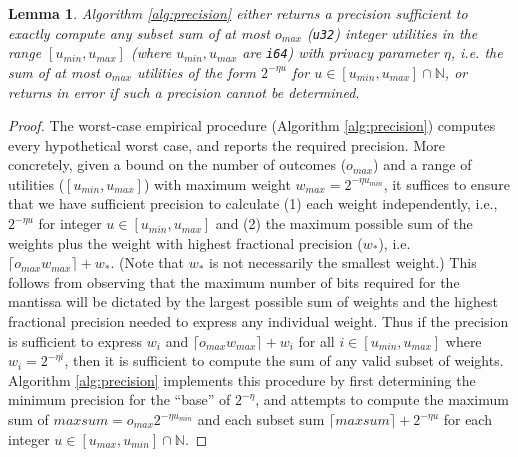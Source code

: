 \documentclass[11pt]{article}
\newtheorem{lemma}[theorem]{Lemma}
\theoremstyle{definition}
\newcommand{\N}{\mathbb{N}}
\newcommand{\unsigned}[1]{{\tt u#1}}
\newcommand{\signed}[1]{{\tt i#1}}
\begin{document}
\begin{lemma}\label{lemma:minexpprec}
Algorithm \ref{alg:precision} either returns a precision sufficient to exactly compute any subset sum of at most $o_{max}$ (\unsigned{32}) integer utilities in the range $[u_{min},u_{max}]$ (where $u_{min},u_{max}$ are \signed{64}) with privacy parameter $\eta$, i.e. the sum of at most $o_{max}$ utilities of the form $2^{-\eta u}$ for $u \in [u_{min},u_{max}] \cap \N$, or returns in error if such a precision cannot be determined.
\end{lemma}
\begin{proof}
The worst-case empirical procedure (Algorithm \ref{alg:precision}) computes every hypothetical worst case, and reports the required precision. More concretely, 
given a bound on the number of outcomes ($o_{max}$) and a range of utilities  ($[u_{min},u_{max}]$) with  maximum weight $w_{max}=2^{-\eta u_{min}}$, it suffices to ensure that we have sufficient precision to calculate (1) each weight independently, i.e., $2^{-\eta u}$ for integer $u \in [u_{min}, u_{max}]$ and (2) the maximum possible sum of the weights plus the weight with highest fractional precision ($w_*$), i.e. $\lceil{o_{max}w_{max}}\rceil + w_{*}$. (Note that $w_*$ is not necessarily the smallest weight.) This follows from observing that the maximum number of bits required for the mantissa will be dictated by the largest possible sum of weights and the highest fractional precision needed to express any individual weight. Thus if the precision is sufficient to express $w_{i}$ and $\lceil{o_{max} w_{max}}\rceil + w_{i}$ for all $i \in [u_{min}, u_{max}]$ where $w_i = 2^{-\eta i}$, then it is sufficient to compute the sum of any valid subset of weights. Algorithm \ref{alg:precision} implements this procedure by first determining the minimum precision for the ``base'' of $2^{-\eta}$, and attempts to compute the maximum sum of $maxsum = o_{max}2^{-\eta u_{min}}$ and each subset sum $\lceil{maxsum}\rceil + 2^{-\eta u}$ for each integer $u \in [u_{max},u_{min}]\cap \N$. 
\end{proof}
\end{document}
